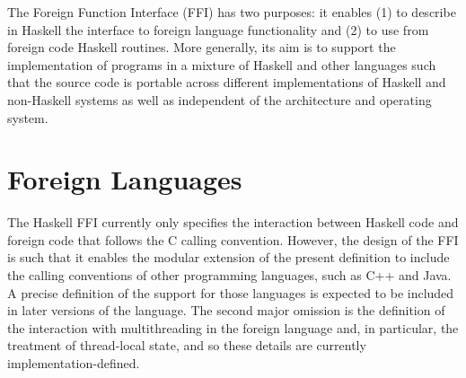 The Foreign Function Interface (FFI) has two purposes: it enables (1) to
describe in Haskell the interface to foreign language functionality and
(2) to use from foreign code Haskell routines.  More generally, its aim
is to support the implementation of programs in a mixture of Haskell and
other languages such that the source code is portable across different
implementations of Haskell and non-Haskell systems as well as
independent of the architecture and operating system.


\section{Foreign Languages}

The Haskell FFI currently only specifies the interaction between Haskell
code and foreign code that follows the C calling convention.  However,
the design of the FFI is such that it enables the modular extension of
the present definition to include the calling conventions of other
programming languages, such as C++ and Java.  A precise definition of
the support for those languages is expected to be included in later
versions of the language.  The second major omission is the definition
of the interaction with multithreading in the foreign language and, in
particular, the treatment of thread-local state, and so these details
are currently implementation-defined.

